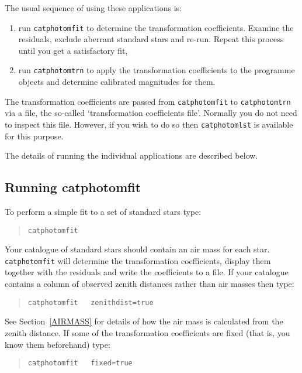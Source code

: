 \documentclass[twoside,11pt]{article}
\renewcommand{\_}{\texttt{\symbol{95}}}
\begin{document}
The usual sequence of using these applications is:

\begin{enumerate}

  \item run {\tt catphotomfit} to determine the transformation
   coefficients.  Examine the residuals, exclude aberrant standard
   stars and re-run.  Repeat this process until you get a satisfactory
   fit,

  \item run {\tt catphotomtrn} to apply the transformation coefficients
   to the programme objects and determine calibrated magnitudes for
   them. 

\end{enumerate}

The transformation coefficients are passed from {\tt catphotomfit} to
{\tt catphotomtrn} via a file, the so-called `transformation
coefficients file'.  Normally you do not need to inspect this file.
However, if you wish to do so then {\tt catphotomlst} is available
for this purpose.

The details of running the individual applications are described below.

\subsection{Running catphotomfit}

To perform a simple fit to a set of standard stars type:

\begin{verse}
{\tt catphotomfit}
\end{verse}

Your catalogue of standard stars should contain an air mass for each
star.  {\tt catphotomfit} will determine the transformation coefficients,
display them together with the residuals and write the coefficients
to a file.  If your catalogue contains a column of observed zenith
distances rather than air masses then type:

\begin{verse}
{\tt catphotomfit ~ zenithdist=true}
\end{verse}

See Section~\ref{AIRMASS} for details of how the air mass is calculated
from the zenith distance.  If some of the transformation coefficients
are fixed (that is, you know them beforehand) type:

\begin{verse}
{\tt catphotomfit ~ fixed=true}
\end{verse}
\end{document}

